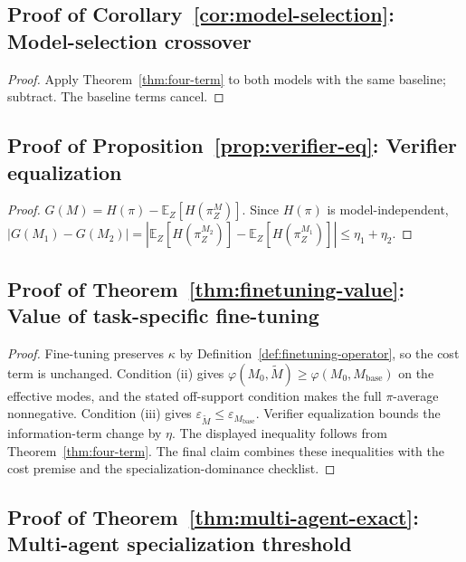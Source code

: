 \documentclass[10pt]{article}
\theoremstyle{paperplain}
\theoremstyle{paperdefinition}
\theoremstyle{paperremark}
\newcommand{\E}{\mathbb{E}}
\begin{document}
\subsection{Proof of Corollary~\ref{cor:model-selection}: Model-selection crossover}
\label{app:proof:cor:model-selection}

\begin{proof}
Apply Theorem~\ref{thm:four-term} to both models with the same baseline; subtract.
The baseline terms cancel.
\end{proof}

\subsection{Proof of Proposition~\ref{prop:verifier-eq}: Verifier equalization}
\label{app:proof:prop:verifier-eq}

\begin{proof}
$G(M) = H(\pi) - \E_Z[H(\pi_Z^M)]$.
Since $H(\pi)$ is model-independent, $|G(M_1) - G(M_2)| = |\E_Z[H(\pi_Z^{M_2})] - \E_Z[H(\pi_Z^{M_1})]| \le \eta_1 + \eta_2$.
\end{proof}

\subsection{Proof of Theorem~\ref{thm:finetuning-value}: Value of task-specific fine-tuning}
\label{app:proof:thm:finetuning-value}

\begin{proof}
Fine-tuning preserves $\kappa$ by Definition~\ref{def:finetuning-operator}, so the cost term is unchanged.
Condition (ii) gives
$\varphi(M_0,\widetilde M)\ge \varphi(M_0,M_{\mathrm{base}})$
on the effective modes, and the stated off-support condition makes the full $\pi$-average nonnegative.
Condition (iii) gives
$\varepsilon_{\widetilde M}\le \varepsilon_{M_{\mathrm{base}}}$.
Verifier equalization bounds the information-term change by $\eta$.
The displayed inequality follows from Theorem~\ref{thm:four-term}.
The final claim combines these inequalities with the cost premise and the specialization-dominance checklist.
\end{proof}

\subsection{Proof of Theorem~\ref{thm:multi-agent-exact}: Multi-agent specialization threshold}
\label{app:proof:thm:multi-agent-exact}
\end{document}
